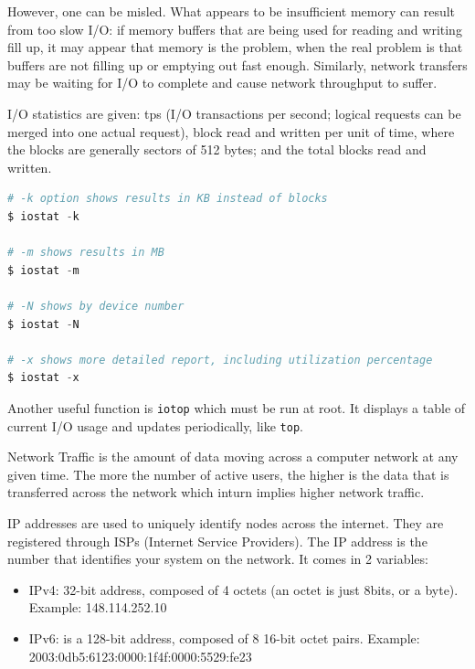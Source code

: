 \documentclass[11pt]{article}
\begin{document}
\noindent However, one can be misled. What appears to be insufficient memory can result from too slow I/O: if memory buffers that are being used for reading and writing fill up, it may appear that memory is the problem, when the real problem is that buffers are not filling up or emptying out fast enough. Similarly, network transfers may be waiting for I/O to complete and cause network throughput to suffer.

\noindent I/O statistics are given: tps (I/O transactions per second; logical requests can be merged into one actual request), block read and written per unit of time, where the blocks are generally sectors of 512 bytes; and the total blocks read and written.

\begin{lstlisting}[language=python]
# -k option shows results in KB instead of blocks
$ iostat -k

# -m shows results in MB
$ iostat -m

# -N shows by device number
$ iostat -N

# -x shows more detailed report, including utilization percentage
$ iostat -x
\end{lstlisting}

\noindent Another useful function is \texttt{iotop} which must be run at root. It displays a table of current I/O usage and updates periodically, like \texttt{top}. 

\noindent Network Traffic is the amount of data moving across a computer network at any given time. The more the number of active users, the higher is the data that is transferred across the network which inturn implies higher network traffic.

\noindent IP addresses are used to uniquely identify nodes across the internet. They are registered through ISPs (Internet Service Providers). The IP address is the number that identifies your system on the network. It comes in 2 variables:
\begin{itemize}
    \item[] IPv4: 32-bit address, composed of 4 octets (an octet is just 8bits, or a byte). Example: 148.114.252.10
    \item[] IPv6: is a 128-bit address, composed of 8 16-bit octet pairs. Example: 2003:0db5:6123:0000:1f4f:0000:5529:fe23
\end{itemize}
\end{document}
